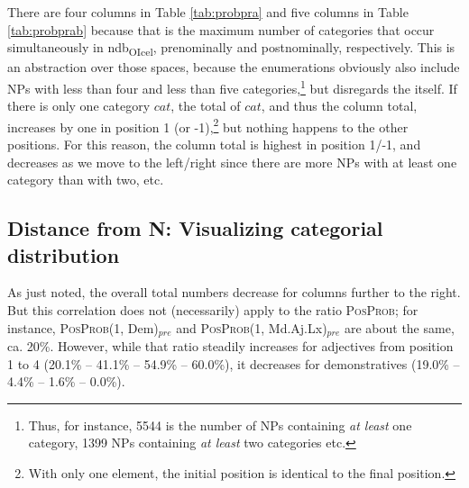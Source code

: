 \documentclass[output=paper,colorlinks,citecolor=brown,draft]{langscibook}
\begin{document}
\begin{sloppypar}
There are four columns in Table \ref{tab:probpra} and five columns in Table \ref{tab:probprab} because that is the maximum number of categories that occur simultaneously in ndb\textsubscript{OIcel}, prenominally and postnominally, respectively. This is an abstraction over those spaces, because the enumerations obviously also include NPs with less than four  and less than five  categories,\footnote{Thus, for instance, 5544 is the number of NPs containing \textit{at least} one  category, 1399 NPs containing \textit{at least} two  categories etc.  }   but disregards the  itself. If there is only one  category $cat$, the total of $cat$,  and thus the column total, increases by one in position 1 (or -1),\footnote{With only one  element, the initial position is  identical to the final position.} 
but nothing happens to the other positions. %
For this reason, the column total is highest in position 1/-1, and decreases as we move to the left/right since there are more NPs with at least one  category than with two, etc. 
\end{sloppypar}



\subsection{Distance from N: Visualizing categorial distribution}
\label{sec:distanz}

As just noted, the overall total numbers decrease for columns further to the right. But this correlation does not (necessarily) apply to the ratio  \textsc{PosProb}; for instance, \textsc{PosProb}(1, Dem)$_{pre}$ and \textsc{PosProb}(1, Md.Aj.Lx)$_{pre}$ are about the same, ca. 20\%. However, while that ratio steadily increases for adjectives from position 1 to 4 (20.1\% -- 41.1\% -- 54.9\% -- 60.0\%), it decreases for demonstratives (19.0\% -- 4.4\% -- 1.6\% -- 0.0\%). 
\end{document}

